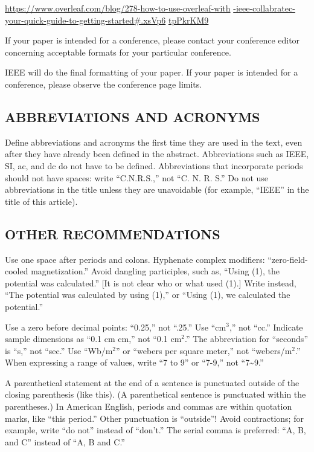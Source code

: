 \documentclass{IEEEoj-data}
\begin{document}
{\underline{https://www.overleaf.com/blog/278-how-to-use-overleaf-with}\break
\underline{-ieee-collabratec-your-quick-guide-to-getting-started\#.xsVp6}\break
\underline{tpPkrKM9}

If your paper is intended for a conference, please contact your conference 
editor concerning acceptable formats for your particular 
conference.

IEEE will do the final formatting of your paper. If your paper is intended 
for a conference, please observe the conference page limits.

\subsection*{ABBREVIATIONS AND ACRONYMS}
Define abbreviations and acronyms the first time they are used in the text, 
even after they have already been defined in the abstract. Abbreviations 
such as IEEE, SI, ac, and dc do not have to be defined. Abbreviations that 
incorporate periods should not have spaces: write ``C.N.R.S.,'' not ``C. N. 
R. S.'' Do not use abbreviations in the title unless they are unavoidable 
(for example, ``IEEE'' in the title of this article).

\subsection*{OTHER RECOMMENDATIONS}
Use one space after periods and colons. Hyphenate complex modifiers: 
``zero-field-cooled magnetization.'' Avoid dangling participles, such as, 
``Using (1), the potential was calculated.'' [It is not clear who or what 
used (1).] Write instead, ``The potential was calculated by using (1),'' or 
``Using (1), we calculated the potential.''

Use a zero before decimal points: ``0.25,'' not ``.25.'' Use ``cm$^3$,'' not 
``cc.'' Indicate sample dimensions as ``0.1 cm  cm,'' not 
``0.1  cm$^{2}$.'' The abbreviation for ``seconds'' is ``s,'' 
not ``sec.'' Use ``Wb/m$^{2}$'' or ``webers per square meter,'' not 
``webers/m$^2$.'' When expressing a range of values, write ``7 to 9'' or 
``7-9,'' not ``7\textasciitilde 9.''

A parenthetical statement at the end of a sentence is punctuated outside of 
the closing parenthesis (like this). (A parenthetical sentence is punctuated 
within the parentheses.) In American English, periods and commas are within 
quotation marks, like ``this period.'' Other punctuation is ``outside''! 
Avoid contractions; for example, write ``do not'' instead of ``don't.'' The 
serial comma is preferred: ``A, B, and C'' instead of ``A, B and C.''

}
\end{document}

